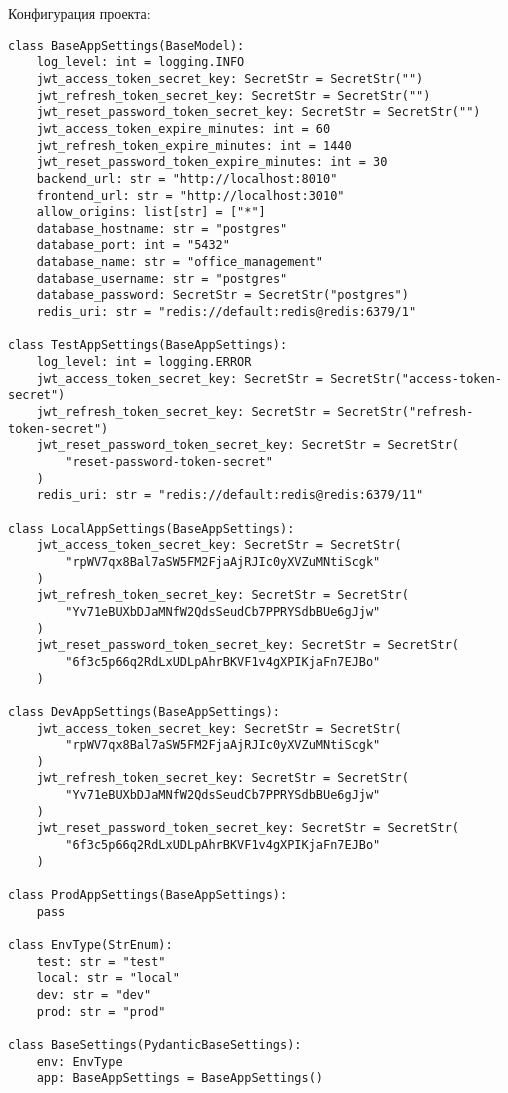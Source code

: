 \noindent
Конфигурация проекта:

\begin{lstlisting}[style=pythonstyle]
class BaseAppSettings(BaseModel):
    log_level: int = logging.INFO
    jwt_access_token_secret_key: SecretStr = SecretStr("")
    jwt_refresh_token_secret_key: SecretStr = SecretStr("")
    jwt_reset_password_token_secret_key: SecretStr = SecretStr("")
    jwt_access_token_expire_minutes: int = 60
    jwt_refresh_token_expire_minutes: int = 1440
    jwt_reset_password_token_expire_minutes: int = 30
    backend_url: str = "http://localhost:8010"
    frontend_url: str = "http://localhost:3010"
    allow_origins: list[str] = ["*"]
    database_hostname: str = "postgres"
    database_port: int = "5432"
    database_name: str = "office_management"
    database_username: str = "postgres"
    database_password: SecretStr = SecretStr("postgres")
    redis_uri: str = "redis://default:redis@redis:6379/1"

class TestAppSettings(BaseAppSettings):
    log_level: int = logging.ERROR
    jwt_access_token_secret_key: SecretStr = SecretStr("access-token-secret")
    jwt_refresh_token_secret_key: SecretStr = SecretStr("refresh-token-secret")
    jwt_reset_password_token_secret_key: SecretStr = SecretStr(
        "reset-password-token-secret"
    )
    redis_uri: str = "redis://default:redis@redis:6379/11"

class LocalAppSettings(BaseAppSettings):
    jwt_access_token_secret_key: SecretStr = SecretStr(
        "rpWV7qx8Bal7aSW5FM2FjaAjRJIc0yXVZuMNtiScgk"
    )
    jwt_refresh_token_secret_key: SecretStr = SecretStr(
        "Yv71eBUXbDJaMNfW2QdsSeudCb7PPRYSdbBUe6gJjw"
    )
    jwt_reset_password_token_secret_key: SecretStr = SecretStr(
        "6f3c5p66q2RdLxUDLpAhrBKVF1v4gXPIKjaFn7EJBo"
    )

class DevAppSettings(BaseAppSettings):
    jwt_access_token_secret_key: SecretStr = SecretStr(
        "rpWV7qx8Bal7aSW5FM2FjaAjRJIc0yXVZuMNtiScgk"
    )
    jwt_refresh_token_secret_key: SecretStr = SecretStr(
        "Yv71eBUXbDJaMNfW2QdsSeudCb7PPRYSdbBUe6gJjw"
    )
    jwt_reset_password_token_secret_key: SecretStr = SecretStr(
        "6f3c5p66q2RdLxUDLpAhrBKVF1v4gXPIKjaFn7EJBo"
    )

class ProdAppSettings(BaseAppSettings):
    pass

class EnvType(StrEnum):
    test: str = "test"
    local: str = "local"
    dev: str = "dev"
    prod: str = "prod"

class BaseSettings(PydanticBaseSettings):
    env: EnvType
    app: BaseAppSettings = BaseAppSettings()


\end{lstlisting}
